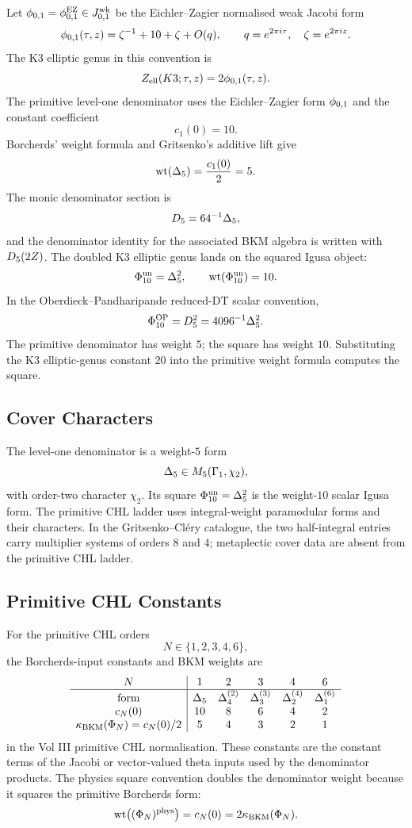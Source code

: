 Let $\phi_{0,1}=\phi_{0,1}^{\mathrm{EZ}}\in J^{\mathrm{wk}}_{0,1}$
be the Eichler--Zagier normalised weak Jacobi form
\[
  \phi_{0,1}(\tau,z)
  = \zeta^{-1}+10+\zeta+O(q),
  \qquad q=e^{2\pi i\tau},\quad \zeta=e^{2\pi iz}.
\]
The K3 elliptic genus in this convention is
\[
  Z_{\mathrm{ell}}(K3;\tau,z)=2\phi_{0,1}(\tau,z).
\]
The primitive level-one denominator uses the Eichler--Zagier form
$\phi_{0,1}$ and the constant coefficient
\[
  c_1(0)=10.
\]
Borcherds' weight formula and Gritsenko's additive lift give
\[
  \operatorname{wt}(\Delta_5)=\frac{c_1(0)}{2}=5.
\]
The monic denominator section is
\[
  D_5=64^{-1}\Delta_5,
\]
and the denominator identity for the associated BKM algebra is written
with $D_5(2Z)$.  The doubled K3 elliptic genus lands on the squared
Igusa object:
\[
  \Phi_{10}^{\mathrm{un}}=\Delta_5^2,
  \qquad \operatorname{wt}(\Phi_{10}^{\mathrm{un}})=10.
\]
In the Oberdieck--Pandharipande reduced-DT scalar convention,
\[
  \Phi_{10}^{\mathrm{OP}}=D_5^2=4096^{-1}\Delta_5^2.
\]
The primitive denominator has weight $5$; the square has weight $10$.
Substituting the K3 elliptic-genus constant $20$ into the primitive
weight formula computes the square.

\subsection*{Cover Characters}

The level-one denominator is a weight-$5$ form
\[
  \Delta_5\in M_5(\Gamma_1,\chi_2),
\]
with order-two character $\chi_2$.  Its square
$\Phi_{10}^{\mathrm{un}}=\Delta_5^2$ is the weight-$10$ scalar Igusa form.  The
primitive CHL ladder uses integral-weight paramodular forms and their
characters.  In the Gritsenko--Cl\'ery catalogue, the two half-integral
entries carry multiplier systems of orders $8$ and $4$; metaplectic
cover data are absent from the primitive CHL ladder.

\subsection*{Primitive CHL Constants}

For the primitive CHL orders
\[
  N\in\{1,2,3,4,6\},
\]
the Borcherds-input constants and BKM weights are
\[
\begin{array}{c|ccccc}
N&1&2&3&4&6\\
\hline
\text{form}&\Delta_5&\Delta_4^{(2)}&\Delta_3^{(3)}&
\Delta_2^{(4)}&\Delta_1^{(6)}\\
c_N(0)&10&8&6&4&2\\
\kappa_{\mathrm{BKM}}(\Phi_N)=c_N(0)/2&5&4&3&2&1
\end{array}
\]
in the Vol III primitive CHL normalisation.  These constants are the
constant terms of the Jacobi or vector-valued theta inputs used by the
denominator products.  The physics square convention doubles the
denominator weight because it squares the primitive Borcherds form:
\[
  \operatorname{wt}\bigl((\Phi_N)^{\mathrm{phys}}\bigr)
  =c_N(0)=2\kappa_{\mathrm{BKM}}(\Phi_N).
\]

